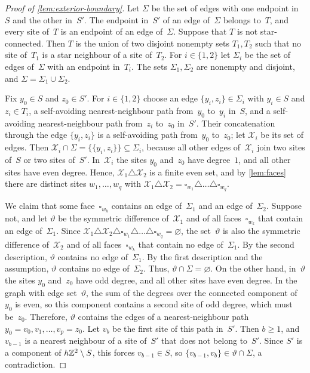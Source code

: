\documentclass[11pt,letterpaper]{article}
\begin{document}
\begin{proof}[Proof of \cref{lem:exterior-boundary}]
Let $\Sigma$ be the set of edges with one endpoint in~$S$ and the other in~$S'$. The endpoint in~$S'$ of an edge of~$\Sigma$ belongs to~$T$, and every site of~$T$ is an endpoint of an edge of~$\Sigma$. Suppose that $T$ is not star-connected. Then $T$ is the union of two disjoint nonempty sets $T_1,T_2$ such that no site of~$T_1$ is a star neighbour of a site of~$T_2$. For $i\in\{1,2\}$ let $\Sigma_i$ be the set of edges of~$\Sigma$ with an endpoint in~$T_i$. The sets $\Sigma_1,\Sigma_2$ are nonempty and disjoint, and $\Sigma=\Sigma_1\cup\Sigma_2$.

Fix $y_0\in S$ and $z_0\in S'$. For $i\in\{1,2\}$ choose an edge $\{y_i,z_i\}\in\Sigma_i$ with $y_i\in S$ and $z_i\in T_i$, a self-avoiding nearest-neighbour path from~$y_0$ to~$y_i$ in~$S$, and a self-avoiding nearest-neighbour path from~$z_i$ to~$z_0$ in~$S'$. Their concatenation through the edge $\{y_i,z_i\}$ is a self-avoiding path from~$y_0$ to~$z_0$; let $\mathcal X_i$ be its set of edges. Then $\mathcal X_i\cap\Sigma=\{\{y_i,z_i\}\}\subseteq\Sigma_i$, because all other edges of~$\mathcal X_i$ join two sites of~$S$ or two sites of~$S'$. In~$\mathcal X_i$ the sites $y_0$ and~$z_0$ have degree~$1$, and all other sites have even degree. Hence, $\mathcal X_1\triangle\mathcal X_2$ is a finite even set, and by \cref{lem:faces} there are distinct sites $w_1,\dots,w_q$ with $\mathcal X_1\triangle\mathcal X_2=\square_{w_1}\triangle\dots\triangle\square_{w_q}$.

We claim that some face~$\square_{w_k}$ contains an edge of~$\Sigma_1$ and an edge of~$\Sigma_2$. Suppose not, and let $\vartheta$ be the symmetric difference of~$\mathcal X_1$ and of all faces~$\square_{w_k}$ that contain an edge of~$\Sigma_1$. Since $\mathcal X_1\triangle\mathcal X_2\triangle\square_{w_1}\triangle\dots\triangle\square_{w_q}=\varnothing$, the set~$\vartheta$ is also the symmetric difference of~$\mathcal X_2$ and of all faces~$\square_{w_k}$ that contain no edge of~$\Sigma_1$. By the second description, $\vartheta$ contains no edge of~$\Sigma_1$. By the first description and the assumption, $\vartheta$ contains no edge of~$\Sigma_2$. Thus, $\vartheta\cap\Sigma=\varnothing$. On the other hand, in~$\vartheta$ the sites $y_0$ and~$z_0$ have odd degree, and all other sites have even degree. In the graph with edge set~$\vartheta$, the sum of the degrees over the connected component of~$y_0$ is even, so this component contains a second site of odd degree, which must be~$z_0$. Therefore, $\vartheta$ contains the edges of a nearest-neighbour path $y_0=v_0,v_1,\dots,v_p=z_0$. Let $v_b$ be the first site of this path in~$S'$. Then $b\ge1$, and $v_{b-1}$ is a nearest neighbour of a site of~$S'$ that does not belong to~$S'$. Since $S'$ is a component of $h\mathbb Z^2\setminus S$, this forces $v_{b-1}\in S$, so $\{v_{b-1},v_b\}\in\vartheta\cap\Sigma$, a contradiction.


\end{proof}
\end{document}
